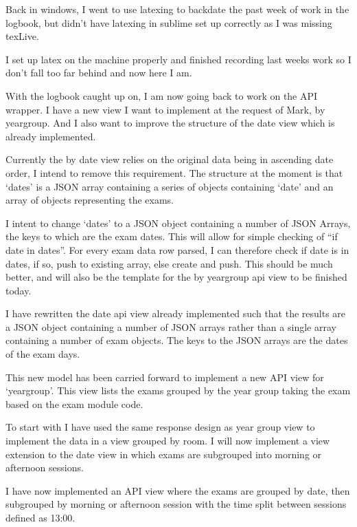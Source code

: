 \documentclass[idxtotoc,hyperref,openany]{labbook} %
\begin{document}
Back in windows, I went to use latexing to backdate the past week of work in the logbook, but didn't have latexing in sublime set up correctly as I was missing texLive.

I set up latex on the machine properly and finished recording last weeks work so I don't fall too far behind and now here I am.


With the logbook caught up on, I am now going back to work on the API wrapper.  I have a new view I want to implement at the request of Mark, by yeargroup.  And I also want to improve the structure of the date view which is already implemented.

Currently the by date view relies on the original data being in ascending date order, I intend to remove this requirement.  The structure at the moment is that `dates' is a JSON array containing a series of objects containing `date' and an array of objects representing the exams.

I intent to change `dates' to a JSON object containing a number of JSON Arrays, the keys to which are the exam dates.  This will allow for simple checking of ``if date in dates''.  For every exam data row parsed, I can therefore check if date is in dates, if so, push to existing array, else create and push.  This should be much better, and will also be the template for the by yeargroup api view to be finished today.

I have rewritten the date api view already implemented such that the results are a JSON object containing a number of JSON arrays rather than a single array containing a number of exam objects.  The keys to the JSON arrays are the dates of the exam days.

This new model has been carried forward to implement a new API view for `yeargroup'.  This view lists the exams grouped by the year group taking the exam based on the exam module code.



To start with I have used the same response design as year group view to implement the data in a view grouped by room.  I will now implement a view extension to the date view in which exams are subgrouped into morning or afternoon sessions.

I have now implemented an API view where the exams are grouped by date, then subgrouped by morning or afternoon session with the time split between sessions defined as 13:00.
\end{document}
